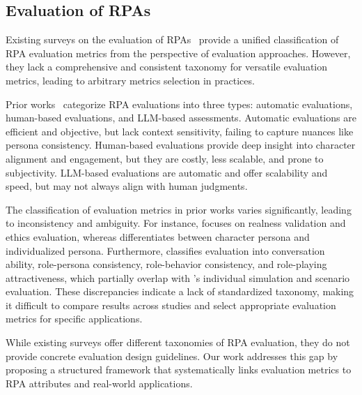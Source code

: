 \subsection{Evaluation of RPAs}
Existing surveys on the evaluation of RPAs~\cite{gao2024large, chen2024from, tseng-etal-2024-two, chen2024oscars, mou2024individual} provide a unified classification of RPA evaluation metrics from the perspective of evaluation approaches. However, they lack a comprehensive and consistent taxonomy for versatile evaluation metrics, leading to arbitrary metrics selection in practices.

Prior works~\cite{gao2024large,mou2024individual} categorize RPA evaluations into three types: automatic evaluations, human-based evaluations, and LLM-based assessments. Automatic evaluations are efficient and objective, but lack context sensitivity, failing to capture nuances like persona consistency. Human-based evaluations provide deep insight into character alignment and engagement, but they are costly, less scalable, and prone to subjectivity. LLM-based evaluations are automatic and offer scalability and speed, but may not always align with human judgments.

The classification of evaluation metrics in prior works varies significantly, leading to inconsistency and ambiguity. For instance, \citet{gao2024large} focuses on realness validation and ethics evaluation, whereas \citet{chen2024from} differentiates between character persona and individualized persona. Furthermore, \citet{chen2024oscars} classifies evaluation into conversation ability, role-persona consistency, role-behavior consistency, and role-playing attractiveness, which partially overlap with \citet{mou2024individual}'s individual simulation and scenario evaluation. These discrepancies indicate a lack of standardized taxonomy, making it difficult to compare results across studies and select appropriate evaluation metrics for specific applications.

While existing surveys offer different taxonomies of RPA evaluation, they do not provide concrete evaluation design guidelines. Our work addresses this gap by proposing a structured framework that systematically links evaluation metrics to RPA attributes and real-world applications.




















